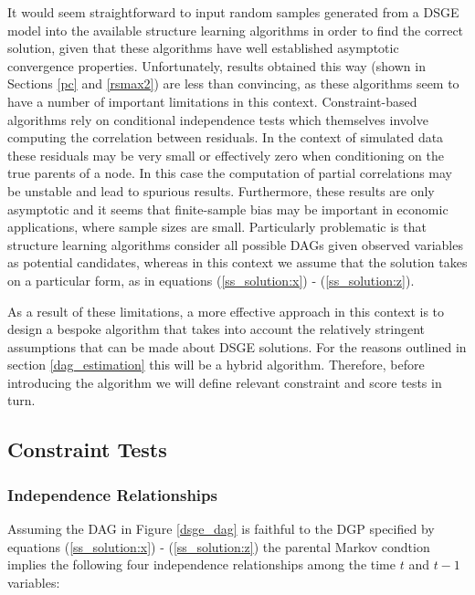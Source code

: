 \documentclass{article}
\begin{document}
It would seem straightforward to input random samples generated from a DSGE model into the available structure learning algorithms in order to find the correct solution, given that these algorithms have well established asymptotic convergence properties. Unfortunately, results obtained this way (shown in Sections \ref{pc} and \ref{rsmax2}) are less than convincing, as these algorithms seem to have a number of important limitations in this context. Constraint-based algorithms rely on conditional independence tests which themselves involve computing the correlation between residuals. In the context of simulated data these residuals may be very small or effectively zero when conditioning on the true parents of a node. In this case the computation of partial correlations may be unstable and lead to spurious results. Furthermore, these results are only asymptotic and it seems that finite-sample bias may be important in economic applications, where sample sizes are small. Particularly problematic is that structure learning algorithms consider all possible DAGs given observed variables as potential candidates, whereas in this context we assume that the solution takes on a particular form, as in equations (\ref{ss_solution:x}) - (\ref{ss_solution:z}).

As a result of these limitations, a more effective approach in this context is to design a bespoke algorithm that takes into account the relatively stringent assumptions that can be made about DSGE solutions. For the reasons outlined in section \ref{dag_estimation} this will be a hybrid algorithm. Therefore, before introducing the algorithm we will define relevant constraint and score tests in turn.

\subsection{Constraint Tests} \label{constrainttests}

\subsubsection{Independence Relationships}

Assuming the DAG in Figure \ref{dsge_dag} is faithful to the DGP specified by equations (\ref{ss_solution:x}) - (\ref{ss_solution:z}) the parental Markov condtion implies the following four independence relationships among the time $t$ and $t-1$ variables:
\end{document}
